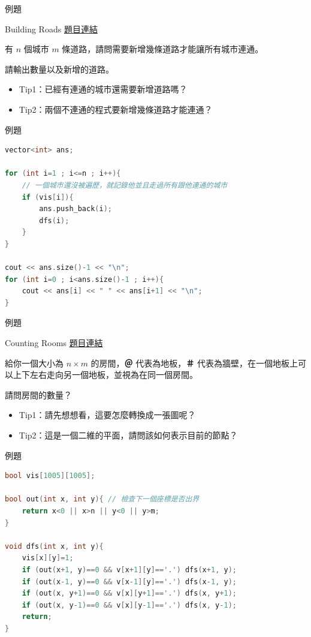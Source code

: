 \documentclass[mathserif]{beamer}
\begin{document}
\begin{frame}{例題}
    \begin{block}{Building Roads}
        \href{https://cses.fi/problemset/task/1666}{題目連結}

        有 $n$ 個城市 $m$ 條道路，請問需要新增幾條道路才能讓所有城市連通。

        請輸出數量以及新增的道路。

    \end{block}
    \begin{itemize}
        \item<2-> Tip1：已經有連通的城市還需要新增道路嗎？
        \item<3-> Tip2：兩個不連通的程式要新增幾條道路才能連通？
    \end{itemize}
\end{frame}


\begin{frame}[fragile]{例題}
\begin{lstlisting}[language=C++, caption={}]
vector<int> ans;

for (int i=1 ; i<=n ; i++){
    // 一個城市還沒被遍歷，就記錄他並且走過所有跟他連通的城市
    if (vis[i]){
        ans.push_back(i);
        dfs(i);
    }
}

cout << ans.size()-1 << "\n";
for (int i=0 ; i<ans.size()-1 ; i++){
    cout << ans[i] << " " << ans[i+1] << "\n";
}
\end{lstlisting}
\end{frame}


\begin{frame}{例題}
    \begin{block}{Counting Rooms}
        \href{https://cses.fi/problemset/task/1192}{題目連結}

        給你一個大小為 $n \times m$ 的房間，\textbf{＠} 代表為地板，\textbf{＃} 代表為牆壁，在一個地板上可以上下左右走向另一個地板，並視為在同一個房間。
        
        請問房間的數量？
    \end{block}
    \begin{itemize}
        \item<2-> Tip1：請先想想看，這要怎麼轉換成一張圖呢？
        \item<3-> Tip2：這是一個二維的平面，請問該如何表示目前的節點？
    \end{itemize}
\end{frame}

\begin{frame}[fragile]{例題}
\begin{lstlisting}[language=C++, caption={}]
bool vis[1005][1005];

bool out(int x, int y){ // 檢查下一個座標是否出界
    return x<0 || x>n || y<0 || y>m;
}

void dfs(int x, int y){
    vis[x][y]=1;
    if (out(x+1, y)==0 && v[x+1][y]=='.') dfs(x+1, y);
    if (out(x-1, y)==0 && v[x-1][y]=='.') dfs(x-1, y);
    if (out(x, y+1)==0 && v[x][y+1]=='.') dfs(x, y+1);
    if (out(x, y-1)==0 && v[x][y-1]=='.') dfs(x, y-1);
    return;
}
\end{lstlisting}
\end{frame}
\end{document}
